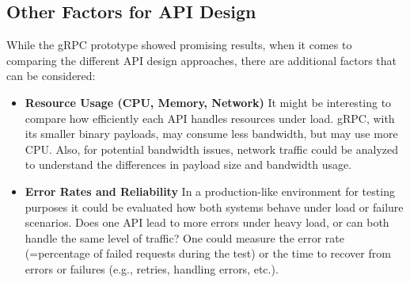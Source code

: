 \subsection{Other Factors for API Design}

While the \ac{gRPC} prototype showed promising results, when it comes to comparing the different \ac{API} design approaches, there are additional factors that can be considered:

\begin{itemize}
    \item \textbf{Resource Usage (CPU, Memory, Network)}
    It might be interesting to compare how efficiently each \ac{API} handles resources under load. \ac{gRPC}, with its smaller binary payloads, may consume less bandwidth, but may use more CPU. 
    Also, for potential bandwidth issues, network traffic could be analyzed to understand the differences in payload size and bandwidth usage.
    
    \item \textbf{Error Rates and Reliability}
    In a production-like environment for testing purposes it could be evaluated how both systems behave under load or failure scenarios. Does one \ac{API} lead to more errors under heavy load, or can both handle the same level of traffic? One could measure the error rate (=percentage of failed requests during the test) or the time to recover from errors or failures (e.g., retries, handling errors, etc.).
\end{itemize}
